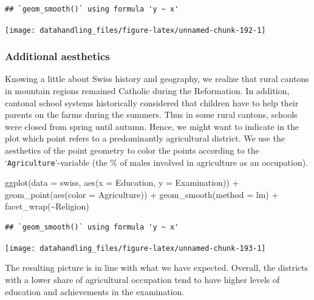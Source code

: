 \documentclass[
  12pt,
]{style/krantz}
\newenvironment{Shaded}{\begin{snugshade}}{\end{snugshade}}
\newcommand{\AttributeTok}[1]{\textcolor[rgb]{0.77,0.63,0.00}{#1}}
\newcommand{\FunctionTok}[1]{\textcolor[rgb]{0.00,0.00,0.00}{#1}}
\newcommand{\NormalTok}[1]{#1}
\newcommand{\SpecialCharTok}[1]{\textcolor[rgb]{0.00,0.00,0.00}{#1}}
\newcommand{\StringTok}[1]{\textcolor[rgb]{0.31,0.60,0.02}{#1}}
\begin{document}
\begin{verbatim}
## `geom_smooth()` using formula 'y ~ x'
\end{verbatim}

\texttt{[image: datahandling\_files/figure-latex/unnamed-chunk-192-1]}

\hypertarget{additional-aesthetics}{%
\subsubsection{Additional aesthetics}\label{additional-aesthetics}}

Knowing a little about Swiss history and geography, we realize that rural cantons in mountain regions remained Catholic during the Reformation. In addition, cantonal school systems historically considered that children have to help their parents on the farms during the summers. Thus in some rural cantons, schools were closed from spring until autumn. Hence, we might want to indicate in the plot which point refers to a predominantly agricultural district. We use the aesthetics of the point geometry to color the points according to the `\texttt{Agriculture}'-variable (the \% of males involved in agriculture as an occupation).

\begin{Shaded}
\begin{Highlighting}[]
\FunctionTok{ggplot}\NormalTok{(}\AttributeTok{data =}\NormalTok{ swiss, }\FunctionTok{aes}\NormalTok{(}\AttributeTok{x =}\NormalTok{ Education, }\AttributeTok{y =}\NormalTok{ Examination)) }\SpecialCharTok{+}
     \FunctionTok{geom\_point}\NormalTok{(}\FunctionTok{aes}\NormalTok{(}\AttributeTok{color =}\NormalTok{ Agriculture)) }\SpecialCharTok{+}
     \FunctionTok{geom\_smooth}\NormalTok{(}\AttributeTok{method =} \StringTok{\textquotesingle{}lm\textquotesingle{}}\NormalTok{) }\SpecialCharTok{+}
     \FunctionTok{facet\_wrap}\NormalTok{(}\SpecialCharTok{\textasciitilde{}}\NormalTok{Religion)}
\end{Highlighting}
\end{Shaded}

\begin{verbatim}
## `geom_smooth()` using formula 'y ~ x'
\end{verbatim}

\texttt{[image: datahandling\_files/figure-latex/unnamed-chunk-193-1]}

The resulting picture is in line with what we have expected. Overall, the districts with a lower share of agricultural occupation tend to have higher levels of education and achievements in the examination.
\end{document}
